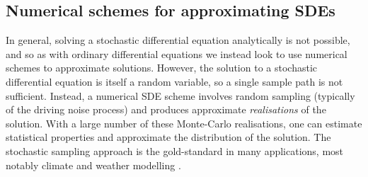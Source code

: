 



\subsection{Numerical schemes for approximating SDEs}\label{sec:numeric_sdes}
In general, solving a stochastic differential equation analytically is not possible, and so as with ordinary differential equations we instead look to use numerical schemes to approximate solutions.
However, the solution to a stochastic differential equation is itself a random variable, so a single sample path is not sufficient.
Instead, a numerical SDE scheme involves random sampling (typically of the driving noise process) and produces approximate \emph{realisations} of the solution.
With a large number of these Monte-Carlo realisations, one can estimate statistical properties and approximate the distribution of the solution.
The stochastic sampling approach is the gold-standard in many applications, most notably climate and weather modelling \citep{Collins_2007_EnsemblesProbabilitiesNew}.

